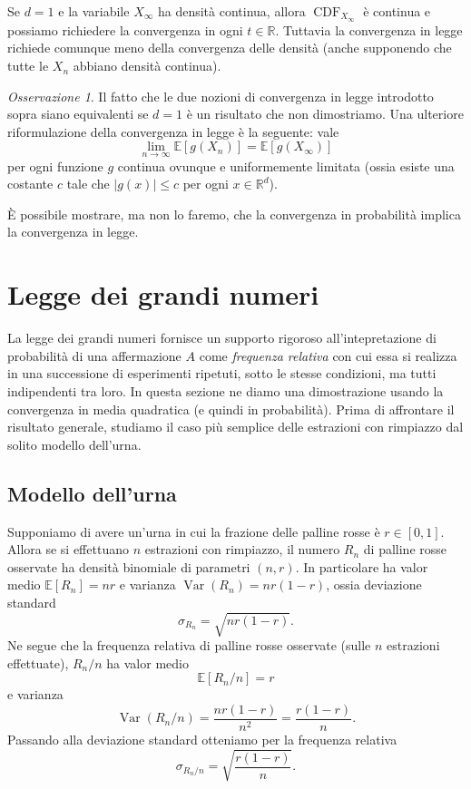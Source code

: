 \documentclass[
  italian,
  letterpaper,
]{book}
\newcommand{\bra}[1]{\left( #1 \right)}
\newcommand{\sqa}[1]{\left[ #1 \right]}
\newcommand{\R}{\mathbb{R}}
\newcommand{\E}[1]{\mathbb{E}\sqa{#1}}
\newcommand{\Var}[1]{\operatorname{Var}\bra{#1}}
\newcommand{\CDF}{\operatorname{CDF}}
\theoremstyle{definition}
\theoremstyle{remark}
\newtheorem*{remark}{Osservazione}
\begin{document}
Se \(d=1\) e la variabile \(X_\infty\) ha densità continua, allora
\(\CDF_{X_\infty}\) è continua e possiamo richiedere la convergenza in
ogni \(t \in \R\). Tuttavia la convergenza in legge richiede comunque
meno della convergenza delle densità (anche supponendo che tutte le
\(X_n\) abbiano densità continua).

\begin{remark}
Il fatto che le due nozioni di convergenza in legge introdotto sopra
siano equivalenti se \(d=1\) è un risultato che non dimostriamo. Una
ulteriore riformulazione della convergenza in legge è la seguente: vale
\[ \lim_{n \to \infty} \E{ g(X_n)} = \E{g(X_\infty)}\] per ogni funzione
\(g\) continua ovunque e uniformemente limitata (ossia esiste una
costante \(c\) tale che \(|g(x)| \le c\) per ogni \(x \in \R^d\)).
\end{remark}

È possibile mostrare, ma non lo faremo, che la convergenza in
probabilità implica la convergenza in legge.

\section{Legge dei grandi numeri}\label{sec-lln}

La legge dei grandi numeri fornisce un supporto rigoroso
all'intepretazione di probabilità di una affermazione \(A\) come
\emph{frequenza relativa} con cui essa si realizza in una successione di
esperimenti ripetuti, sotto le stesse condizioni, ma tutti indipendenti
tra loro. In questa sezione ne diamo una dimostrazione usando la
convergenza in media quadratica (e quindi in probabilità). Prima di
affrontare il risultato generale, studiamo il caso più semplice delle
estrazioni con rimpiazzo dal solito modello dell'urna.

\subsection{Modello dell'urna}\label{modello-dellurna}

Supponiamo di avere un'urna in cui la frazione delle palline rosse è
\(r \in [0,1]\). Allora se si effettuano \(n\) estrazioni con rimpiazzo,
il numero \(R_n\) di palline rosse osservate ha densità binomiale di
parametri \((n,r)\). In particolare ha valor medio \(\E{R_n} = nr\) e
varianza \(\Var{R_n} = nr(1-r)\), ossia deviazione standard
\[\sigma_{R_n} = \sqrt{ n r (1-r)}.\] Ne segue che la frequenza relativa
di palline rosse osservate (sulle \(n\) estrazioni effettuate),
\(R_n/n\) ha valor medio \[ \E{ R_n/n} = r\] e varianza
\[  \Var{R_n/n}= \frac{n r(1-r)}{n^2} = \frac{r(1-r)}{n}.\] Passando
alla deviazione standard otteniamo per la frequenza relativa
\[ \sigma_{R_n/n} = \sqrt{ \frac{ r(1-r)}{n}}.\]
\end{document}
